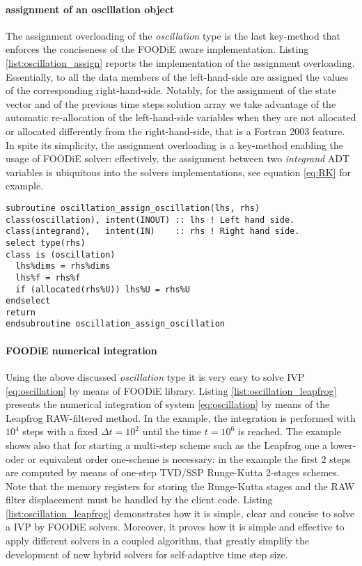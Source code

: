 \paragraph{assignment of an oscillation object}

The assignment overloading of the \emph{oscillation} type is the last key-method that enforces the conciseness of the FOODiE aware implementation. Listing \ref{list:oscillation_assign} reports the implementation of the assignment overloading. Essentially, to all the data members of the left-hand-side are assigned the values of the corresponding right-hand-side. Notably, for the assignment of the state vector and of the previous time steps solution array we take advantage of the automatic re-allocation of the left-hand-side variables when they are not allocated or allocated differently from the right-hand-side, that is a Fortran 2003 feature. In spite its simplicity, the assignment overloading is a key-method enabling the usage of FOODiE solver: effectively, the assignment between two \emph{integrand} ADT variables is ubiquitous into the solvers implementations, see equation \ref{eq:RK} for example.

\begin{lstlisting}[firstnumber=1,style=code,caption={implementation of the \emph{oscillation integrand} assignment},label={list:oscillation_assign}]
subroutine oscillation_assign_oscillation(lhs, rhs)
class(oscillation), intent(INOUT) :: lhs ! Left hand side.
class(integrand),   intent(IN)    :: rhs ! Right hand side.
select type(rhs)
class is (oscillation)
  lhs%dims = rhs%dims
  lhs%f = rhs%f
  if (allocated(rhs%U)) lhs%U = rhs%U
endselect
return
endsubroutine oscillation_assign_oscillation
\end{lstlisting}

\paragraph{FOODiE numerical integration}

Using the above discussed \emph{oscillation} type it is very easy to solve IVP \ref{eq:oscillation} by means of FOODiE library. Listing \ref{list:oscillation_leapfrog} presents the numerical integration of system \ref{eq:oscillation} by means of the Leapfrog RAW-filtered method. In the example, the integration is performed with $10^4$ steps with a fixed $\Delta t=10^2$ until the time $t=10^6$ is reached. The example shows also that for starting a multi-step scheme such as the Leapfrog one a lower-oder or equivalent order one-scheme is necessary: in the example the first 2 steps are computed by means of one-step TVD/SSP Runge-Kutta 2-stages schemes. Note that the memory registers for storing the Runge-Kutta stages and the RAW filter displacement must be handled by the client code. Listing \ref{list:oscillation_leapfrog} demonstrates how it is simple, clear and concise to solve a IVP by FOODiE solvers. Moreover, it proves how it is simple and effective to apply different solvers in a coupled algorithm, that greatly simplify the development of new hybrid solvers for self-adaptive time step size.

